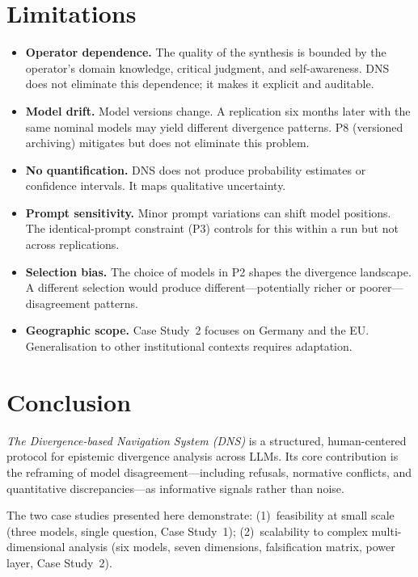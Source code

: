 \documentclass[10pt,a4paper]{article}
\begin{document}
\section{Limitations}
\label{sec:limitations}

\begin{itemize}
  \item \textbf{Operator dependence.} The quality of the synthesis is bounded by
        the operator's domain knowledge, critical judgment, and self-awareness.
        DNS does not eliminate this dependence; it makes it explicit and auditable.
  \item \textbf{Model drift.} Model versions change. A replication six months later
        with the same nominal models may yield different divergence patterns.
        P8 (versioned archiving) mitigates but does not eliminate this problem.
  \item \textbf{No quantification.} DNS does not produce probability estimates or
        confidence intervals. It maps qualitative uncertainty.
  \item \textbf{Prompt sensitivity.} Minor prompt variations can shift model
        positions. The identical-prompt constraint (P3) controls for this within
        a run but not across replications.
  \item \textbf{Selection bias.} The choice of models in P2 shapes the divergence
        landscape. A different selection would produce different—potentially
        richer or poorer—disagreement patterns.
  \item \textbf{Geographic scope.} Case Study~2 focuses on Germany and the EU.
        Generalisation to other institutional contexts requires adaptation.
\end{itemize}

\section{Conclusion}
\label{sec:conclusion}

\textit{The Divergence-based Navigation System (DNS)} is a structured, human-centered
protocol for epistemic divergence analysis across LLMs. Its core contribution is the
reframing of model disagreement—including refusals, normative conflicts, and
quantitative discrepancies—as informative signals rather than noise.

The two case studies presented here demonstrate:
(1)~feasibility at small scale (three models, single question, Case Study~1);
(2)~scalability to complex multi-dimensional analysis (six models, seven
    dimensions, falsification matrix, power layer, Case Study~2).
\end{document}
